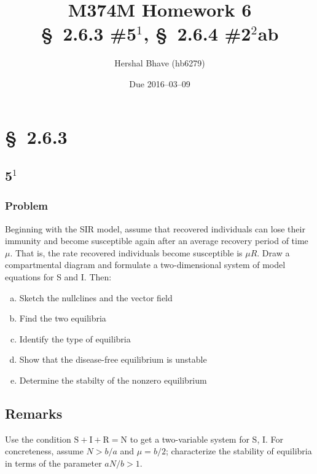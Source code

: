 \documentclass[12pt]{article}
\title{M374M Homework 6 \\
  \normalsize{\S~2.6.3 \#5$^1$, \S~2.6.4 \#2$^2$ab}}
\author{Hershal Bhave (hb6279)}
\date{Due 2016--03--09}
\begin{document}
\maketitle
\section{\S~2.6.3}
\subsection{5$^1$}
\subsubsection*{Problem}
Beginning with the SIR model, assume that recovered individuals can lose their
immunity and become susceptible again after an average recovery period of time
$\mu$. That is, the rate recovered individuals become susceptible is $\mu R$.
Draw a compartmental diagram and formulate a two-dimensional system of model
equations for S and I. Then:
\begin{enumerate}[(a)]
\item Sketch the nullclines and the vector field
\item Find the two equilibria
\item Identify the type of equilibria
\item Show that the disease-free equilibrium is unstable
\item Determine the stabilty of the nonzero equilibrium
\end{enumerate}

\subsection*{Remarks}
Use the condition $\text{S} + \text{I} + \text{R} = \text{N}$ to get a
two-variable system for S, I. For concreteness, assume $N>b/a$ and $\mu=b/2$;
characterize the stability of equilibria in terms of the parameter $aN/b>1$.
\end{document}
